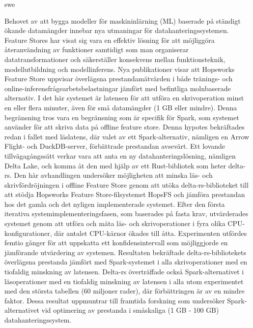 \markboth{\abstractname}{}
\begin{scontents}[store-env=lang]
swe
\end{scontents}
\begin{scontents}[store-env=abstracts,print-env=true]
Behovet av att bygga modeller för maskininlärning (ML) baserade på ständigt ökande datamängder innebar nya utmaningar för datahanteringssystemen. Feature Stores har visat sig vara en effektiv lösning för att möjliggöra återanvändning av funktioner samtidigt som man organiserar datatransformationer och säkerställer konsekvens mellan funktionsteknik, modellutbildning och modellinferens. Nya publikationer visar att Hopsworks Feature Store uppvisar överlägsna prestandamätvärden i både tränings- och online-inferensfrågearbetsbelastningar jämfört med befintliga molnbaserade alternativ. I det här systemet är latensen för att utföra en skrivoperation minst en eller flera minuter, även för små datamängder (1 GB eller mindre). Denna begränsning tros vara en begränsning som är specifik för Spark, som systemet använder för att skriva data på offline feature store. Denna hypotes bekräftades redan i fallet med läslatens, där valet av ett Spark-alternativ, nämligen en Arrow Flight- och DuckDB-server, förbättrade prestandan avsevärt. Ett lovande tillvägagångssätt verkar vara att anta en ny datahanteringslösning, nämligen Delta Lake, och komma åt den med hjälp av ett Rust-bibliotek som heter delta-rs. Den här avhandlingen undersöker möjligheten att minska läs- och skrivfördröjningen i offline Feature Store genom att utöka delta-rs-biblioteket till att stödja Hopsworks Feature Store-filsystemet HopsFS och jämföra prestandan hos det gamla och det nyligen implementerade systemet. Efter den första iterativa systemimplementeringsfasen, som baserades på fasta krav, utvärderades systemet genom att utföra och mäta läs- och skrivoperationer i fyra olika CPU-konfigurationer, där antalet CPU-kärnor ökades till åtta. Experimenten utfördes femtio gånger för att uppskatta ett konfidensintervall som möjliggjorde en jämförande utvärdering av systemen. Resultaten bekräftade delta-rs-bibliotekets överlägsna prestanda jämfört med Spark-systemet i alla skrivoperationer med en tiofaldig minskning av latensen. Delta-rs överträffade också Spark-alternativet i läsoperationer med en tiofaldig minskning av latensen i alla utom experimentet med den största tabellen (60 miljoner rader), där förbättringen är av en mindre faktor. Dessa resultat uppmuntrar till framtida forskning som undersöker Spark-alternativet vid optimering av prestanda i småskaliga (1 GB - 100 GB) datahanteringssystem.

\end{scontents}
